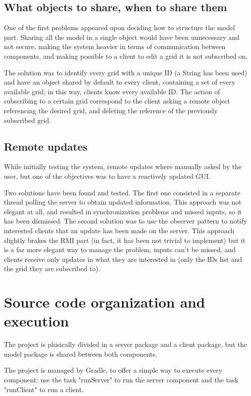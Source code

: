 \documentclass[12pt, a4paper]{report}
\begin{document}
\subsection{What objects to share, when to share them}
One of the first problems appeared upon deciding how to structure the model
 part. Sharing all the model in a single object would have been unnecessary
 and not secure, making the system heavier in terms of communication between
 components, and making possible to a client to edit a grid it is not
 subscribed on.

The solution was to identify every grid with a unique ID (a String has been
 used) and have an object shared by default to every client, containing a set
 of every available grid; in this way, clients know every available ID. The
 action of subscribing to a certain grid correspond to the client asking a
 remote object referencing the desired grid, and deleting the reference of the
 previously subscribed grid.

\subsection{Remote updates}
While initially testing the system, remote updates where manually asked by the
 user, but one of the objectives was to have a reactively updated GUI.

Two solutions have been found and tested. The first one consisted in a separate
 thread polling the server to obtain updated information. This approach was not
 elegant at all, and resulted in synchronization problems and missed inputs, so
 it has been dismissed. The second solution was to use the observer pattern to
 notify interested clients that an update has been made on the server. This
 approach slightly brakes the RMI part (in fact, it has been not trivial to
 implement) but it is a far more elegant way to manage the problem, inputs
 can't be missed, and clients receive only updates in what they are interested
 in (only the IDs list and the grid they are subscribed to).

\section{Source code organization and execution}
The project is phisically divided in a server package and a client package, but the
 model package is shared between both components.

The project is managed by Gradle, to offer a simple way to execute every
 component: use the task "runServer" to run the server component and the task
 "runClient" to run a client.
\end{document}
